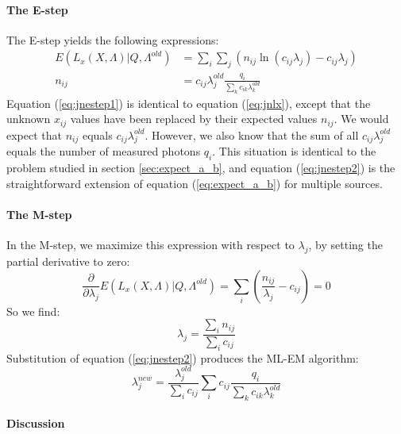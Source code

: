 \documentclass[11pt,oneside]{book}
\begin{document}
\paragraph{The E-step\\}
The E-step yields the following expressions:
\begin{align}
E(L_x(X, \Lambda) | Q, \Lambda^{old}) &= 
   \sum_i \sum_j ( n_{ij} \ln (c_{ij} \lambda_j) -  c_{ij} \lambda_j)
   \label{eq:jnestep1}\\
n_{ij} &= c_{ij} \lambda_j^{old} \frac{q_i}{\sum_k c_{ik} \lambda_k^{old}}
   \label{eq:jnestep2}
\end{align}
Equation (\ref{eq:jnestep1}) is identical to equation (\ref{eq:jnlx}), except
that the unknown $x_{ij}$ values have been replaced by their expected values
$n_{ij}$. We would expect that $n_{ij}$ equals $c_{ij}
\lambda_j^{old}$. However, we also know that the sum of all $c_{ij}
\lambda_j^{old}$ equals the number of measured photons $q_i$. This situation
is identical to the problem studied in section \ref{sec:expect_a_b}, and 
equation (\ref{eq:jnestep2}) is the straightforward extension of equation
(\ref{eq:expect_a_b}) for multiple sources.

\paragraph{The M-step\\}
In the M-step, we maximize this expression with respect to $\lambda_j$, by
setting the partial derivative to zero:
\begin{equation}
\frac{\partial}{\partial \lambda_j} E(L_x(X, \Lambda) | Q, \Lambda^{old})
   =  \sum_i \left( \frac{n_{ij}}{\lambda_j} - c_{ij} \right) = 0
\end{equation}
So we find:
\begin{equation}
 \lambda_j  =  \frac{\sum_i n_{ij}}{\sum_i c_{ij}} \label{eq:jnmstep}
\end{equation}
Substitution of equation (\ref{eq:jnestep2}) produces the ML-EM
algorithm:
\begin{equation}
  \lambda_j^{new}  =  \frac{\lambda_j^{old}}{\sum_i c_{ij}}
           \sum_i c_{ij}  \frac{q_i}{\sum_k c_{ik} \lambda_k^{old}}
           \label{eq:jnmlem}
\end{equation}

\paragraph{Discussion\\}
\end{document}
